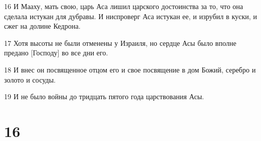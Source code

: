 \par 16 И Мааху, мать свою, царь Аса лишил царского достоинства за то, что она сделала истукан для дубравы. И ниспроверг Аса истукан ее, и изрубил в куски, и сжег на долине Кедрона.
\par 17 Хотя высоты не были отменены у Израиля, но сердце Асы было вполне предано [Господу] во все дни его.
\par 18 И внес он посвященное отцом его и свое посвящение в дом Божий, серебро и золото и сосуды.
\par 19 И не было войны до тридцать пятого года царствования Асы.

\chapter{16}

